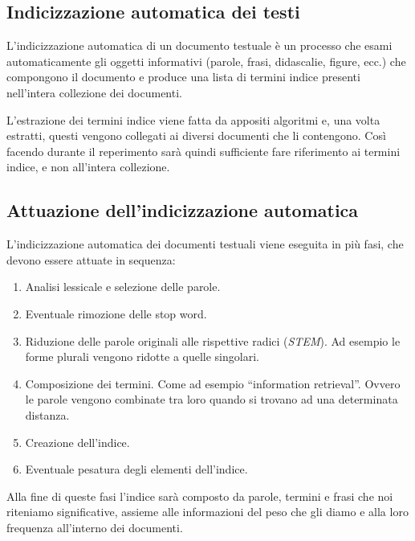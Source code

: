 \subsection{Indicizzazione automatica dei testi}

L'indicizzazione automatica di un documento testuale è un processo che esami automaticamente gli oggetti informativi (parole, frasi, didascalie, figure, ecc.) che compongono il documento e produce una lista di termini indice presenti nell'intera collezione dei documenti.

L'estrazione dei termini indice viene fatta da appositi algoritmi e, una volta estratti, questi vengono collegati ai diversi documenti che li contengono.
Così facendo durante il reperimento sarà quindi sufficiente fare riferimento ai termini indice, e non all'intera collezione.

\subsection{Attuazione dell'indicizzazione automatica}

L'indicizzazione automatica dei documenti testuali viene eseguita in più fasi, che devono essere attuate in sequenza:

\begin{enumerate}
	\item Analisi lessicale e selezione delle parole.
	\item Eventuale rimozione delle stop word.
	\item Riduzione delle parole originali alle rispettive radici (\textit{STEM}). Ad esempio le forme plurali vengono ridotte a quelle singolari.
	\item Composizione dei termini. Come ad esempio ``information retrieval''. Ovvero le parole vengono combinate tra loro quando si trovano ad una determinata distanza.
	\item Creazione dell'indice.
	\item Eventuale pesatura degli elementi dell'indice. 
\end{enumerate}

Alla fine di queste fasi l'indice sarà composto da parole, termini e frasi che noi riteniamo significative, assieme alle informazioni del peso che gli diamo e alla loro frequenza all'interno dei documenti.








